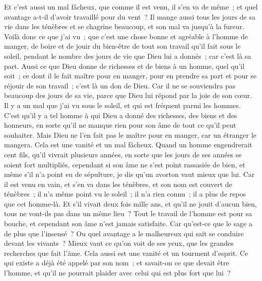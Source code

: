 \begin{multicols}{2}
Et c'est aussi un mal fâcheux, que comme il est venu, il s'en va de même~; et quel avantage a-t-il d'avoir travaillé pour du vent~?
Il mange aussi tous les jours de sa vie dans les ténèbres et se chagrine beaucoup, et son mal va jusqu'à la fureur.
Voilà donc ce que j'ai vu~; que c'est une chose bonne et agréable à l'homme de manger, de boire et de jouir du bien-être de tout son travail qu'il fait sous le soleil, pendant le nombre des jours de vie que Dieu lui a donnés~; car c'est là sa part.
Aussi ce que Dieu donne de richesses et de biens à un homme, quel qu'il soit~; ce dont il le fait maître pour en manger, pour en prendre sa part et pour se réjouir de son travail~; c'est là un don de Dieu.
Car il ne se souviendra pas beaucoup des jours de sa vie, parce que Dieu lui répond par la joie de son cœur.
\VerseOne{}Il y a un mal que j'ai vu sous le soleil, et qui est fréquent parmi les hommes.
C'est qu'il y a tel homme à qui Dieu a donné des richesses, des biens et des honneurs, en sorte qu'il ne manque rien pour son âme de tout ce qu'il peut souhaiter. Mais Dieu ne l'en fait pas le maître pour en manger, car un étranger le mangera. Cela est une vanité et un mal fâcheux.
Quand un homme engendrerait cent fils, qu'il vivrait plusieurs années, en sorte que les jours de ses années se soient fort multipliés, cependant si son âme ne s'est point rassasiée de bien, et même s'il n'a point eu de sépulture, je dis qu'un avorton vaut mieux que lui.
Car il est venu en vain, et s'en va dans les ténèbres, et son nom est couvert de ténèbres~;
il n'a même point vu le soleil~; il n'a rien connu~; il a plus de repos que cet homme-là.
Et s'il vivait deux fois mille ans, et qu'il ne jouit d'aucun bien, tous ne vont-ils pas dans un même lieu~?
Tout le travail de l'homme est pour sa bouche, et cependant son âme n'est jamais satisfaite.
Car qu'est-ce que le sage a de plus que l'insensé~? Ou quel avantage a le malheureux qui sait se conduire devant les vivants~?
Mieux vaut ce qu'on voit de ses yeux, que les grandes recherches que fait l'âme. Cela aussi est une vanité et un tourment d'esprit.
Ce qui existe a déjà été appelé par son nom~; et savait-on ce que devait être l'homme, et qu'il ne pourrait plaider avec celui qui est plus fort que lui~?

\end{multicols}
